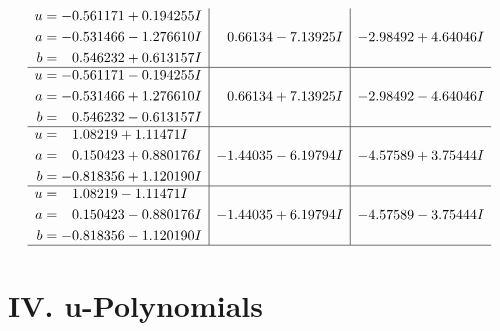\documentclass[1p]{elsarticle_modified}
\theoremstyle{definition}
\begin{document}
$$\begin{array}{c|c|c}
\begin{aligned}
u &= -0.561171 + 0.194255 I \\
a &= -0.531466 - 1.276610 I \\
b &= \phantom{-}0.546232 + 0.613157 I\end{aligned}
 & \phantom{-}0.66134 - 7.13925 I & -2.98492 + 4.64046 I \\ \hline\begin{aligned}
u &= -0.561171 - 0.194255 I \\
a &= -0.531466 + 1.276610 I \\
b &= \phantom{-}0.546232 - 0.613157 I\end{aligned}
 & \phantom{-}0.66134 + 7.13925 I & -2.98492 - 4.64046 I \\ \hline\begin{aligned}
u &= \phantom{-}1.08219 + 1.11471 I \\
a &= \phantom{-}0.150423 + 0.880176 I \\
b &= -0.818356 + 1.120190 I\end{aligned}
 & -1.44035 - 6.19794 I & -4.57589 + 3.75444 I \\ \hline\begin{aligned}
u &= \phantom{-}1.08219 - 1.11471 I \\
a &= \phantom{-}0.150423 - 0.880176 I \\
b &= -0.818356 - 1.120190 I\end{aligned}
 & -1.44035 + 6.19794 I & -4.57589 - 3.75444 I\\
 \hline 
 \end{array}$$\newpage
\newpage\renewcommand{\arraystretch}{1}
\centering \section*{ IV. u-Polynomials}
\end{document}
